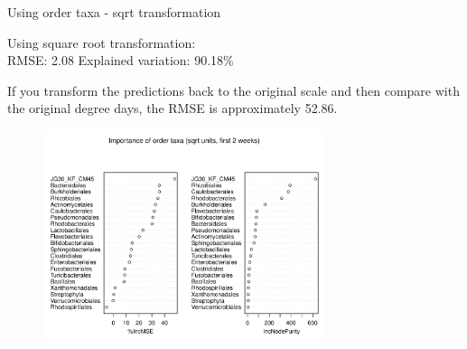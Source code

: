 \documentclass{beamer}
\begin{document}
\begin{frame}{Using order taxa - sqrt transformation}

  {\scriptsize
    
  \noindent Using square root transformation:\\
  RMSE: 2.08  \hspace{0.05in}  Explained variation: 90.18\%

  \vspace{0.05in}
  
  \noindent If you transform the predictions back to the original
  scale and then compare with the original degree days, the RMSE is
  approximately 52.86.
  
\begin{center}
\begin{figure}
  \includegraphics[width=3.25in]{../only_orders/first_two_weeks/sqrt_units_first_two_weeks_orders_imp_plot}
\end{figure}
\end{center}
\vspace{-0.25in}
}
  
\end{frame}




    

\end{document}
